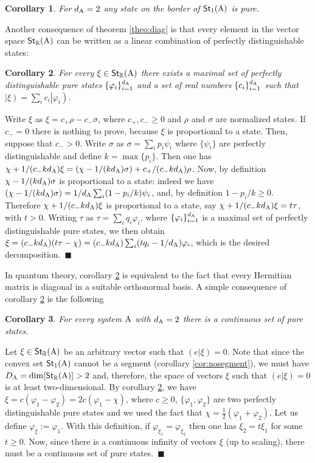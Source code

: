 \documentclass[12pt,aps,pra,showpacs,groupedaddress]{revtex4-1}
\newtheorem{corollary}{Corollary} \newtheorem{theorem}{Theorem}
\def\Proof{\medskip\par\noindent{\bf Proof. }}
\def\qed{$\,\blacksquare$\par}
\def\Stset{{\mathsf{St}}}
\def\K#1{\left|#1\right)}  \def\B#1{\left(#1\right|}
\def\SC#1#2{\left(#1\right|\left.\!#2\right)}  \def\Tr{{\rm Tr}}
\def\Reals{{\mathbb R}}
\begin{document}
\begin{corollary}\label{cor:pureborder}
  For $d_{\rm A}=2$ any state on the border of $\Stset_1 (\rA)$ is pure.
\end{corollary}

Another consequence of theorem \ref{theo:diag} is that every element in the vector space
$\Stset_\Reals (\rA)$ can be written as a linear combination of perfectly distinguishable states:
\begin{corollary}\label{cor:spectraldecomp}
  For every $\xi \in\Stset_\Reals (\rA)$ there exists a maximal set of perfectly distinguishable
  pure states $\{\varphi_i\}_{i=1}^{d_{\rm A}}$ and a set of real numbers $\{c_i\}_{i=1}^{d_{\rm A}}$ such
  that $\K{\xi} = \sum_i c_i \K{\varphi_i}$.
\end{corollary}  

\Proof Write $\xi$ as $\xi =c_+ \rho -c_- \sigma$, where $c_+, c_-\ge 0$ and $\rho$ and $\sigma$ are
normalized states.  If $c_- =0$ there is nothing to prove, because $\xi$ is proportional to a state.
Then, suppose that $c_- >0$.  Write $\sigma$ as $\sigma =\sum_i p_i \psi_i$ where $\{\psi_i\}$ are
perfectly distinguishable and define $k = \max\{p_i\}$. Then one has $\chi + 1/(c_- k d_{\rm A}) \xi =
(\chi - 1/(kd_{\rm A}) \sigma) + c_+/(c_-kd_{\rm A}) \rho$. Now, by definition $\chi - 1/(kd_{\rm A}) \sigma$ is
proportional to a state: indeed we have $(\chi - 1/(kd_{\rm A}) \sigma) = 1/d_{\rm A} \sum_i (1- p_i/k)
\psi_i$, and, by definition $1-p_i/k\ge 0$.  Therefore $\chi + 1/(c_- k d_{\rm A}) \xi$ is proportional
to a state, say $\chi + 1/(c_- k d_{\rm A}) \xi = t \tau$, with $t>0$. Writing $\tau$ as $\tau = \sum_i
q_i \varphi_i$, where $\{\varphi_i\}_{i=1}^{d_{\rm A}}$ is a maximal set of perfectly distinguishable
pure states, we then obtain $\xi = (c_- k d_{\rm A}) (t \tau - \chi) =(c_- k d_{\rm A}) \sum_i (t q_i -
1/d_{\rm A}) \varphi_i$, which is the desired decomposition. \qed

In quantum theory, corollary \ref{cor:spectraldecomp} is equivalent to the fact that every Hermitian matrix is diagonal in a suitable orthonormal basis.  
A simple consequence of corollary \ref{cor:spectraldecomp} is the following
\begin{corollary}\label{cor:continuouspurestates}
For every system ${\rm A}$ with $d_{\rm A}=2$ there is a continuous set of pure states.
\end{corollary}
\Proof Let $\xi\in\Stset_\Reals (\rA)$ be an arbitrary vector such that $\SC e \xi =0$.  Note that
since the convex set $\Stset_1 (\rA)$ cannot be a segment (corollary \ref{cor:nosegment}), we must
have $D_\rA = {\rm dim}  [\Stset_\Reals (\rA)] >2$ and, therefore, the space of vectors $\xi$ such that $\SC e \xi = 0$ is at least
two-dimensional.  By corollary \ref{cor:spectraldecomp}, we have $\xi = c (\varphi_1
-\varphi_2) = 2c( \varphi_1 - \chi)$, where $c\ge 0$,  $\{\varphi_1, \varphi_2\}$ are two perfectly
distinguishable pure states and we used the fact that $\chi = \frac 12 (\varphi_1 + \varphi_2)$.
Let us define $\varphi_\xi := \varphi_1$.  With this definition, if $\varphi_{\xi_1} =
\varphi_{\xi_2}$ then one has $\xi_2 = t \xi_1$ for some $t\ge 0$.  Now, since there is a continuous
infinity of vectors $\xi$ (up to scaling), there must be a continuous set of pure states.  \qed
\end{document}

